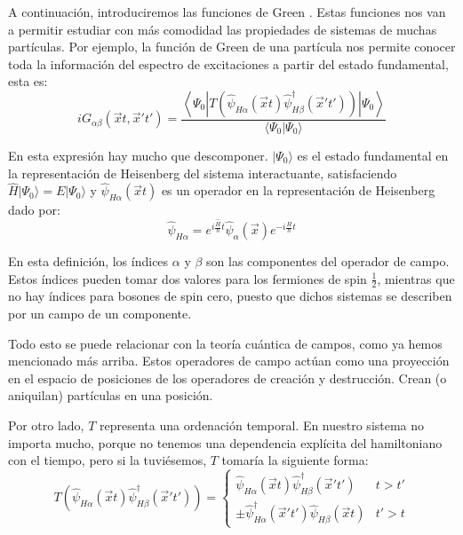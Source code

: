 \documentclass[12pt,twoside]{article}
\begin{document}
A continuación, introduciremos las funciones de Green \cite{fetter1971quantum}. Estas funciones nos van a permitir estudiar con más comodidad las propiedades de sistemas de muchas partículas. Por ejemplo, la función de Green de una partícula nos permite conocer toda la información del espectro de excitaciones a partir del estado fundamental, esta es:
\begin{equation}
  iG_{\alpha\beta}(\vec{x}t, \vec{x}'t') = \frac{\left\langle\Psi_0|T\left(\hat{\psi}_{H\alpha}(\vec{x}t)\hat{\psi}^{\dagger}_{H\beta}(\vec{x}'t')\right)|\Psi_0\right\rangle}{\langle\Psi_0|\Psi_0\rangle}
  \label{eq:GreenFunction}
\end{equation}

En esta expresión hay mucho que descomponer. $|\Psi_0\rangle$ es el estado fundamental en la representación de Heisenberg del sistema interactuante, satisfaciendo $\hat{H}|\Psi_0\rangle = E|\Psi_0\rangle$ y $\hat{\psi}_{H\alpha}(\vec{x}t)$ es un operador en la representación de Heisenberg dado por:
\begin{equation}
  \hat{\psi}_{H\alpha} = e^{i\frac{\hat{H}}{\hbar}t}\hat{\psi}_{\alpha}(\vec{x})e^{-i\frac{H}{\hbar}t}
\end{equation}

En esta definición, los índices $\alpha$ y $\beta$ son las componentes del operador de campo. Estos índices pueden tomar dos valores para los fermiones de spin $\frac{1}{2}$, mientras que no hay índices para bosones de spin cero, puesto que dichos sistemas se describen por un campo de un componente.

Todo esto se puede relacionar con la teoría cuántica de campos, como ya hemos mencionado más arriba. Estos operadores de campo actúan como una proyección en el espacio de posiciones de los operadores de creación y destrucción. Crean (o aniquilan) partículas en una posición.

Por otro lado, $T$ representa una ordenación temporal. En nuestro sistema no importa mucho, porque no tenemos una dependencia explícita del hamiltoniano con el tiempo, pero si la tuviésemos, $T$ tomaría la siguiente forma:
\begin{equation}
  T\left(\hat{\psi}_{H\alpha}(\vec{x}t)\hat{\psi}^{\dagger}_{H\beta}(\vec{x}'t')\right) = \left\{\begin{array}{cc}
      \hat{\psi}_{H\alpha}(\vec{x}t)\hat{\psi}^{\dagger}_{H\beta}(\vec{x}'t') & t > t' \\
      \pm\hat{\psi}_{H\alpha}^{\dagger}(\vec{x}'t')\hat{\psi}_{H\beta}(\vec{x}t) & t' > t
  \end{array}\right.
\end{equation}
\end{document}
